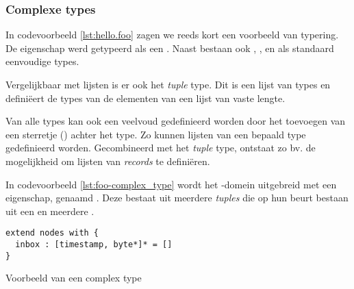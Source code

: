 \vspace{-3mm}

\subsubsection{Complexe types}

In codevoorbeeld \ref{lst:hello.foo} zagen we reeds kort een voorbeeld van
typering. De  eigenschap werd getypeerd als een . Naast
 bestaan ook , ,  en
 als standaard eenvoudige types.

Vergelijkbaar met lijsten is er ook het \emph{tuple} type. Dit is een lijst van
types en defini\"eert de types van de elementen van een lijst van vaste lengte.

Van alle types kan ook een veelvoud gedefinieerd worden door het toevoegen van
een sterretje (\ttt{*}) achter het type. Zo kunnen lijsten van een bepaald type
gedefinieerd worden. Gecombineerd met het \emph{tuple} type, ontstaat zo bv. de
mogelijkheid om lijsten van \emph{records} te defini\"eren.

In codevoorbeeld \ref{lst:foo-complex_type} wordt het -domein
uitgebreid met een eigenschap, genaamd . Deze bestaat uit meerdere
\emph{tuples} die op hun beurt bestaan uit een  en meerdere
.

\begin{listing}[ht]
  \begin{verbatim}
extend nodes with {
  inbox : [timestamp, byte*]* = []
}
  \end{verbatim}
  \vspace{-5mm}
  \caption{Voorbeeld van een complex type}
  \label{lst:foo-complex_type}
\end{listing}
